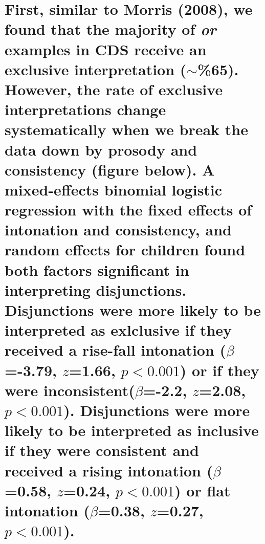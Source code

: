\documentclass[10pt, letterpaper]{article}
\begin{document}
\section{\texorpdfstring{First, similar to Morris (2008), we found that
the majority of \emph{or} examples in CDS receive an exclusive
interpretation (\(\sim\)\%65). However, the rate of exclusive
interpretations change systematically when we break the data down by
prosody and consistency (figure below). A mixed-effects binomial
logistic regression with the fixed effects of intonation and
consistency, and random effects for children found both factors
significant in interpreting disjunctions. Disjunctions were more likely
to be interpreted as exlclusive if they received a rise-fall intonation
(\(\beta\)=-3.79, \(z\)=1.66, \(p < 0.001\)) or if they were
inconsistent(\(\beta\)=-2.2, \(z\)=2.08, \(p < 0.001\)). Disjunctions
were more likely to be interpreted as inclusive if they were consistent
and received a rising intonation (\(\beta\)=0.58, \(z\)=0.24,
\(p < 0.001\)) or flat intonation (\(\beta\)=0.38, \(z\)=0.27,
\(p < 0.001\)).}{First, similar to Morris (2008), we found that the majority of or examples in CDS receive an exclusive interpretation (\textbackslash{}sim\%65). However, the rate of exclusive interpretations change systematically when we break the data down by prosody and consistency (figure below). A mixed-effects binomial logistic regression with the fixed effects of intonation and consistency, and random effects for children found both factors significant in interpreting disjunctions. Disjunctions were more likely to be interpreted as exlclusive if they received a rise-fall intonation (\textbackslash{}beta=-3.79, z=1.66, p \textless{} 0.001) or if they were inconsistent(\textbackslash{}beta=-2.2, z=2.08, p \textless{} 0.001). Disjunctions were more likely to be interpreted as inclusive if they were consistent and received a rising intonation (\textbackslash{}beta=0.58, z=0.24, p \textless{} 0.001) or flat intonation (\textbackslash{}beta=0.38, z=0.27, p \textless{} 0.001).}}\label{first-similar-to-morris-2008-we-found-that-the-majority-of-or-examples-in-cds-receive-an-exclusive-interpretation-sim65.-however-the-rate-of-exclusive-interpretations-change-systematically-when-we-break-the-data-down-by-prosody-and-consistency-figure-below.-a-mixed-effects-binomial-logistic-regression-with-the-fixed-effects-of-intonation-and-consistency-and-random-effects-for-children-found-both-factors-significant-in-interpreting-disjunctions.-disjunctions-were-more-likely-to-be-interpreted-as-exlclusive-if-they-received-a-rise-fall-intonation-beta-3.79-z1.66-p-0.001-or-if-they-were-inconsistentbeta-2.2-z2.08-p-0.001.-disjunctions-were-more-likely-to-be-interpreted-as-inclusive-if-they-were-consistent-and-received-a-rising-intonation-beta0.58-z0.24-p-0.001-or-flat-intonation-beta0.38-z0.27-p-0.001.}
\end{document}
